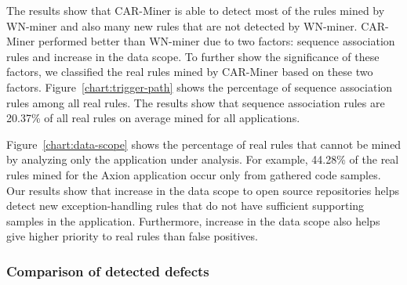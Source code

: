 The results show that CAR-Miner is able to detect most of the rules mined 
by WN-miner and also many new rules that are not detected by WN-miner.
CAR-Miner performed better than WN-miner due to two factors: sequence
association rules and increase in the data scope. To further show the significance
of these factors, we classified the real rules mined by CAR-Miner based
on these two factors. Figure~\ref{chart:trigger-path} shows the percentage of 
sequence association rules among all real rules. The results show that 
sequence association rules are 20.37\% of all real rules on average mined for all applications.

Figure~\ref{chart:data-scope} shows the percentage of real rules 
that cannot be mined by analyzing only the application under analysis. For example,
44.28\% of the real rules mined for the Axion application occur only from 
gathered code samples. Our results show that increase in the data scope
to open source repositories helps detect new exception-handling rules that 
do not have sufficient supporting samples in the application. Furthermore, 
increase in the data scope also helps give higher priority to real rules than false positives.
\vspace*{-1.5ex}
\subsubsection{Comparison of detected defects}

